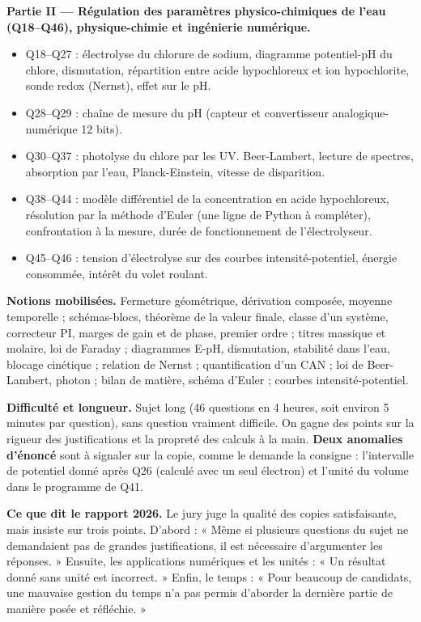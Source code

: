 \documentclass[11pt,a4paper]{article}
\providecommand{\tightlist}{\setlength{\itemsep}{0pt}\setlength{\parskip}{0pt}}
\begin{document}
\textbf{Partie II --- Régulation des paramètres physico-chimiques de l'eau (Q18--Q46), physique-chimie et ingénierie numérique.}

\begin{itemize}
\tightlist
\item
  Q18--Q27 : électrolyse du chlorure de sodium, diagramme potentiel-pH du chlore, dismutation, répartition entre acide hypochloreux et ion hypochlorite, sonde redox (Nernst), effet sur le pH.
\item
  Q28--Q29 : chaîne de mesure du pH (capteur et convertisseur analogique-numérique 12 bits).
\item
  Q30--Q37 : photolyse du chlore par les UV. Beer-Lambert, lecture de spectres, absorption par l'eau, Planck-Einstein, vitesse de disparition.
\item
  Q38--Q44 : modèle différentiel de la concentration en acide hypochloreux, résolution par la méthode d'Euler (une ligne de Python à compléter), confrontation à la mesure, durée de fonctionnement de l'électrolyseur.
\item
  Q45--Q46 : tension d'électrolyse sur des courbes intensité-potentiel, énergie consommée, intérêt du volet roulant.
\end{itemize}

\textbf{Notions mobilisées.} Fermeture géométrique, dérivation composée, moyenne temporelle ; schémas-blocs, théorème de la valeur finale, classe d'un système, correcteur PI, marges de gain et de phase, premier ordre ; titres massique et molaire, loi de Faraday ; diagrammes E-pH, dismutation, stabilité dans l'eau, blocage cinétique ; relation de Nernst ; quantification d'un CAN ; loi de Beer-Lambert, photon ; bilan de matière, schéma d'Euler ; courbes intensité-potentiel.

\textbf{Difficulté et longueur.} Sujet long (46 questions en 4 heures, soit environ 5 minutes par question), sans question vraiment difficile. On gagne des points sur la rigueur des justifications et la propreté des calculs à la main. \textbf{Deux anomalies d'énoncé} sont à signaler sur la copie, comme le demande la consigne : l'intervalle de potentiel donné après Q26 (calculé avec un seul électron) et l'unité du volume dans le programme de Q41.

\textbf{Ce que dit le rapport 2026.} Le jury juge la qualité des copies satisfaisante, mais insiste sur trois points. D'abord : « Même si plusieurs questions du sujet ne demandaient pas de grandes justifications, il est nécessaire d'argumenter les réponses. » Ensuite, les applications numériques et les unités : « Un résultat donné sans unité est incorrect. » Enfin, le temps : « Pour beaucoup de candidats, une mauvaise gestion du temps n'a pas permis d'aborder la dernière partie de manière posée et réfléchie. »
\end{document}
